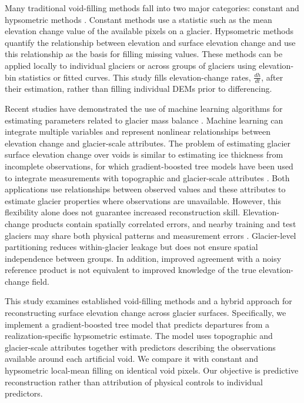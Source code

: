 \documentclass[tc,manuscript]{copernicus}
\begin{document}
Many traditional void-filling methods fall into two major categories: constant and hypsometric methods \citep{arendt2002, huss2012}. Constant methods use a statistic such as the mean elevation change value of the available pixels on a glacier. Hypsometric methods quantify the relationship between elevation and surface elevation change and use this relationship as the basis for filling missing values. These methods can be applied locally to individual glaciers or across groups of glaciers using elevation-bin statistics or fitted curves. This study fills elevation-change rates, $\frac{dh}{dt}$, after their estimation, rather than filling individual DEMs prior to differencing. 

Recent studies have demonstrated the use of machine learning algorithms for estimating parameters related to glacier mass balance \citep{bolibar2020, vandermeer2025}. Machine learning can integrate multiple variables and represent nonlinear relationships between elevation change and glacier-scale attributes. The problem of estimating glacier surface elevation change over voids is similar to estimating ice thickness from incomplete observations, for which gradient-boosted tree models have been used to integrate measurements with topographic and glacier-scale attributes \citep{maffezzoli2025}. Both applications use relationships between observed values and these attributes to estimate glacier properties where observations are unavailable. However, this flexibility alone does not guarantee increased reconstruction skill. Elevation-change products contain spatially correlated errors, and nearby training and test glaciers may share both physical patterns and measurement errors \citep{rolstad2009, hugonnet2022}. Glacier-level partitioning reduces within-glacier leakage but does not ensure spatial independence between groups. In addition, improved agreement with a noisy reference product is not equivalent to improved knowledge of the true elevation-change field.

This study examines established void-filling methods and a hybrid approach for reconstructing surface elevation change across glacier surfaces. Specifically, we implement a gradient-boosted tree model that predicts departures from a realization-specific hypsometric estimate. The model uses topographic and glacier-scale attributes together with predictors describing the observations available around each artificial void. We compare it with constant and hypsometric local-mean filling on identical void pixels. Our objective is predictive reconstruction rather than attribution of physical controls to individual predictors.
\end{document}
